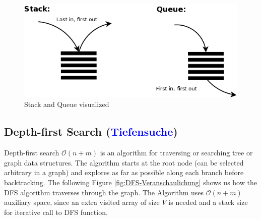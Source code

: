 \documentclass[a4paper]{article}
\begin{document}
\begin{figure}[h]
    \centering
    \includegraphics[scale = 0.5]{Pictures/Stack and Queue.png}
    \caption{Stack and Queue visualized}
    \label{fig:Queue and Stack}
\end{figure}

    
\subsection{ Depth-first Search (\textcolor{blue}{Tiefensuche})}
Depth-first search $\mathcal{O}(n+m)$ is an algorithm for traversing or searching tree or graph data structures. The algorithm starts at the root node (can be selected arbitrary in a graph) and explores as far as possible along each branch before backtracking. The following Figure \ref{fig:DFS-Veranschaulichung} shows us how the DFS algorithm traverses through the graph. The Algorithm uses $\mathcal{O}(n+m)$ auxiliary space, since an extra visited array of size $V$ is needed and a stack size for iterative call to DFS function.
\end{document}
